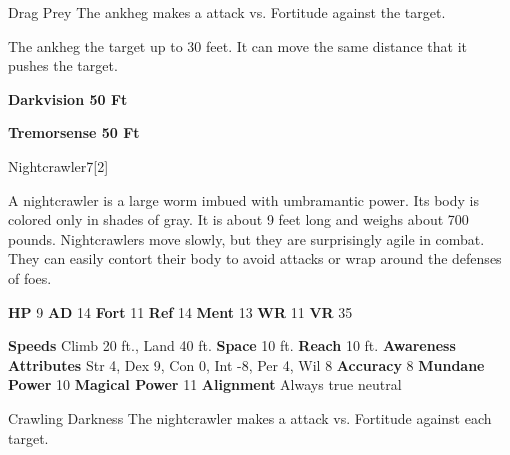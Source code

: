     \begin{freeability}{Drag Prey}
       The ankheg makes a  attack
        vs. Fortitude against the target.
    
    \hit The ankheg  the target up to 30 feet.
          It can move the same distance that it pushes the target.
    \end{freeability}
  
      \par \textbf{Darkvision 50 Ft}
    \par \textbf{Tremorsense 50 Ft}
  
  \begin{monsection}{Nightcrawler}{7}[2]
    \vspace{-1em}\vspace{-1em}
    \vspace{0em}

    
      A nightcrawler is a large worm imbued with umbramantic power.
      Its body is colored only in shades of gray.
      It is about 9 feet long and weighs about 700 pounds.
      Nightcrawlers move slowly, but they are surprisingly agile in combat.
      They can easily contort their body to avoid attacks or wrap around the defenses of foes.
    
    

    \begin{spellcontent}
      \begin{spelltargetinginfo}
        \pari \textbf{HP} 9 \monsep
          \textbf{AD} 14 \monsep
          \textbf{Fort} 11 \monsep
          \textbf{Ref} 14 \monsep
          \textbf{Ment} 13
        \pari \textbf{WR} 11 \monsep
        \textbf{VR} 35
        
      \end{spelltargetinginfo}
    \end{spellcontent}
    \begin{monsterfooter}
      \pari \textbf{Speeds} Climb 20 ft., Land 40 ft. \monsep
        \textbf{Space} 10 ft. \monsep
        \textbf{Reach} 10 ft.
      \pari \textbf{Awareness} 
      \pari \textbf{Attributes}
        Str 4, Dex 9,
        Con 0, Int -8,
        Per 4, Wil 8
      \pari \textbf{Accuracy} 8 \monsep
        \textbf{Mundane Power} 10 \monsep
      \textbf{Magical Power} 11
      \pari \textbf{Alignment} Always true neutral
    \end{monsterfooter}
  \end{monsection}
  \begin{freeability}{Crawling Darkness}
       The nightcrawler makes a  attack
        vs. Fortitude against each target.
    \end{freeability}
  


